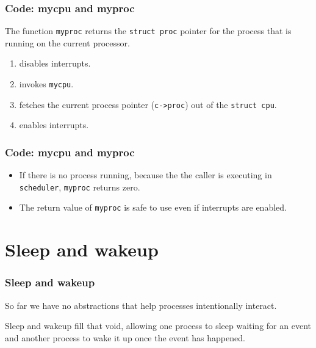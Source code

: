 \documentclass{beamer}
\begin{document}

\begin{frame}[t]
  \frametitle{Code: mycpu and myproc}
  The function \texttt{myproc} returns the \texttt{struct proc} pointer for the process
  that is running on the current processor.

  \begin{enumerate}
  \item disables interrupts.
  \item invokes \texttt{mycpu}.
  \item fetches the current process pointer (\texttt{c->proc}) out of the
    \texttt{struct cpu}.
  \item enables interrupts.
  \end{enumerate}
  
\end{frame}


\begin{frame}[t]

  \frametitle{Code: mycpu and myproc}
  \begin{itemize}
  \item If there is no process running, because the the caller is executing in \texttt{scheduler},
    \texttt{myproc} returns zero.
  \item The return value of \texttt{myproc} is safe to use even if interrupts are enabled.
  \end{itemize}
  
\end{frame}


\section{Sleep and wakeup}


\begin{frame}[t]
  \frametitle{Sleep and wakeup}
  So far we have no abstractions that help processes intentionally interact.\\
  \begin{center}
    Sleep and wakeup fill that void, allowing one process to sleep waiting for an
    event and another process to wake it up once the event has happened.
  \end{center}
  
\end{frame}
\end{document}
